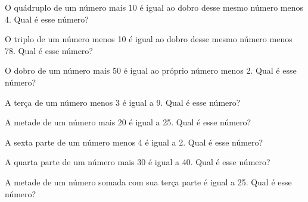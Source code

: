 \item O quádruplo de um número mais 10 é igual ao dobro desse mesmo número menos 4. Qual é esse número?

\item O triplo de um número menos 10 é igual ao dobro desse mesmo número menos 78. Qual é esse número?

\item O dobro de um número mais 50 é igual ao próprio número menos 2. Qual é esse número?

\item A terça de um número menos 3 é igual a 9. Qual é esse número?

\item A metade de um número mais 20 é igual a 25. Qual é esse número?

\item A sexta parte de um número menos 4 é igual a 2. Qual é esse número?

\item A quarta parte de um número mais 30 é igual a 40. Qual é esse número?

\item A metade de um número somada com sua terça parte é igual a 25. Qual é esse número?

